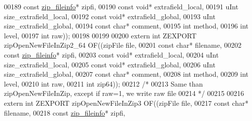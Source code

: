 \begin{DoxyCode}
00189                                             \textcolor{keyword}{const} \hyperlink{structzip__fileinfo}{zip\_fileinfo}* zipfi,
00190                                             \textcolor{keyword}{const} \textcolor{keywordtype}{void}* extrafield\_local,
00191                                             uInt size\_extrafield\_local,
00192                                             \textcolor{keyword}{const} \textcolor{keywordtype}{void}* extrafield\_global,
00193                                             uInt size\_extrafield\_global,
00194                                             \textcolor{keyword}{const} \textcolor{keywordtype}{char}* comment,
00195                                             \textcolor{keywordtype}{int} method,
00196                                             \textcolor{keywordtype}{int} level,
00197                                             \textcolor{keywordtype}{int} raw));
00198 
00199 
00200 \textcolor{keyword}{extern} \textcolor{keywordtype}{int} ZEXPORT zipOpenNewFileInZip2\_64 OF((zipFile file,
00201                                             \textcolor{keyword}{const} \textcolor{keywordtype}{char}* filename,
00202                                             \textcolor{keyword}{const} \hyperlink{structzip__fileinfo}{zip\_fileinfo}* zipfi,
00203                                             \textcolor{keyword}{const} \textcolor{keywordtype}{void}* extrafield\_local,
00204                                             uInt size\_extrafield\_local,
00205                                             \textcolor{keyword}{const} \textcolor{keywordtype}{void}* extrafield\_global,
00206                                             uInt size\_extrafield\_global,
00207                                             \textcolor{keyword}{const} \textcolor{keywordtype}{char}* comment,
00208                                             \textcolor{keywordtype}{int} method,
00209                                             \textcolor{keywordtype}{int} level,
00210                                             \textcolor{keywordtype}{int} raw,
00211                                             \textcolor{keywordtype}{int} zip64));
00212 \textcolor{comment}{/*}
00213 \textcolor{comment}{  Same than zipOpenNewFileInZip, except if raw=1, we write raw file}
00214 \textcolor{comment}{ */}
00215 
00216 \textcolor{keyword}{extern} \textcolor{keywordtype}{int} ZEXPORT zipOpenNewFileInZip3 OF((zipFile file,
00217                                             \textcolor{keyword}{const} \textcolor{keywordtype}{char}* filename,
00218                                             \textcolor{keyword}{const} \hyperlink{structzip__fileinfo}{zip\_fileinfo}* zipfi,

\end{DoxyCode}

